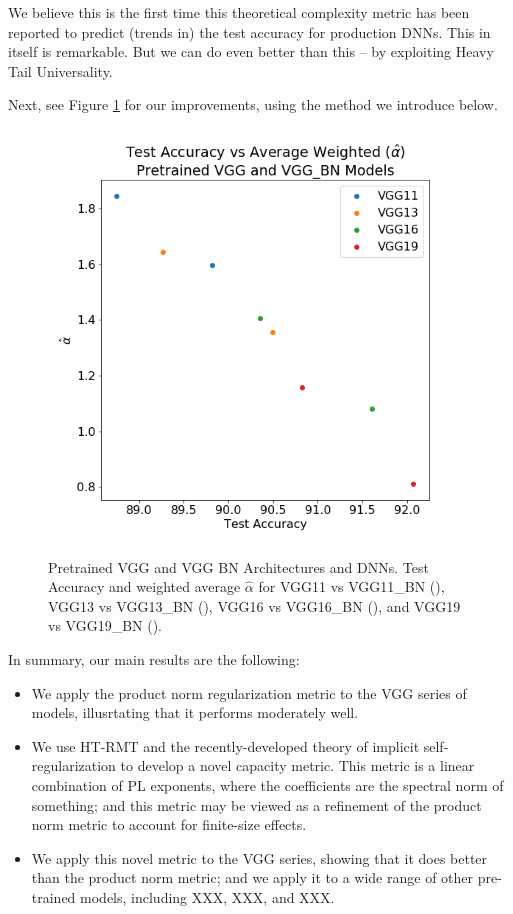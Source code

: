 We believe this is the first time this theoretical complexity metric has been reported to predict (trends in) the test accuracy for production
DNNs.  This in itself is remarkable.  But we can do even better than this -- by exploiting Heavy Tail Universality.


Next, see Figure \ref{fig:vgg_alphahat} for our improvements, using the method we introduce below.

\begin{figure}[!htb]
 \centering
   \includegraphics[scale=0.40]{img/vgg-w_alphas.png}
   \caption{
Pretrained VGG and VGG BN Architectures and DNNs.  Test Accuracy and weighted average $\hat{\alpha}$ for
 VGG11 vs VGG11\_BN ({\color{blue}{blue}}),
VGG13 vs VGG13\_BN ({\color{orange}{orange}}),
VGG16 vs VGG16\_BN ({\color{green}{green}}),  and
VGG19 vs VGG19\_BN ({\color{red}{red}}). 
}
  \label{fig:vgg_alphahat}
\end{figure}

In summary, our main results are the following:
\begin{itemize}
\item
We apply the product norm regularization metric to the VGG series of models, illusrtating that it performs moderately well.
\item
We use HT-RMT and the recently-developed theory of implicit self-regularization to develop a novel capacity metric.
This metric is a linear combination of PL exponents, where the coefficients are the spectral norm of something; and this metric may be viewed as a refinement of the product norm metric to account for finite-size effects.
\item
We apply this novel metric to the VGG series, showing that it does better than the product norm metric; and we apply it to a wide range of other pre-trained models, including XXX, XXX, and XXX.
\end{itemize}

